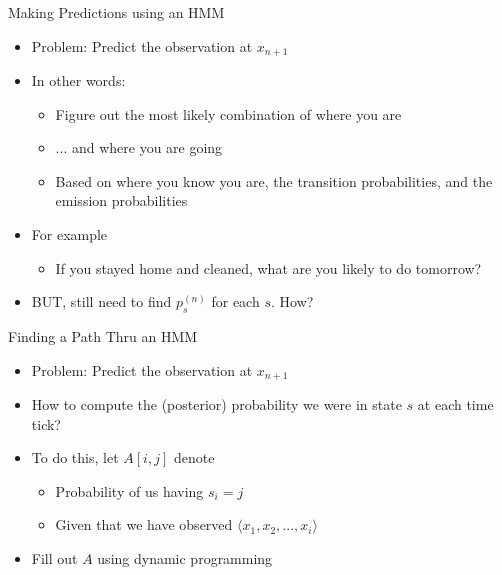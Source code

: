 \documentclass[aspectratio=169]{beamer}
\begin{document}
\begin{frame}{Making Predictions using an HMM}

\begin{itemize}
\item Problem: Predict the observation at $x_{n+1}$

\item In other words:
	\begin{itemize}
	\item Figure out the most likely combination of where you are 
	\item ... and where you are going 
	\item Based on where you know you are, the transition probabilities, and the emission probabilities
	\end{itemize}	
\item For example
	\begin{itemize}
	\item If you stayed home and cleaned, what are you likely to do tomorrow?
	\end{itemize}	

\item BUT, still need to find $p^{(n)}_s$ for each $s$. How?
\end{itemize}

\end{frame}
\begin{frame}{Finding a Path Thru an HMM}

\begin{itemize}
\item Problem: Predict the observation at $x_{n+1}$
\item How to compute the (posterior) probability we were in state $s$ at each time tick?
\item To do this, let $A[i,j]$ denote
	\begin{itemize}
	\item Probability of us having $s_i = j$
	\item Given that we have observed $\langle x_1, x_2, ..., x_i \rangle$
	\end{itemize}
\item Fill out $A$ using dynamic programming
\end{itemize}
\end{frame}
\end{document}
